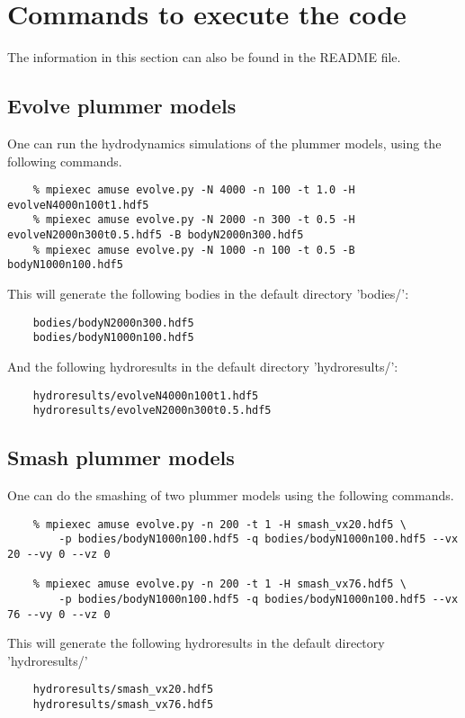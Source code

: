 \documentclass[a4paper]{article}
\begin{document}
\section{Commands to execute the code}
\label{sec:legends}
The information in this section can also be found in the README file.
\subsection{Evolve plummer models}
One can run the hydrodynamics simulations of the plummer models, using the following commands.
    \begin{verbatim}
    % mpiexec amuse evolve.py -N 4000 -n 100 -t 1.0 -H evolveN4000n100t1.hdf5
    % mpiexec amuse evolve.py -N 2000 -n 300 -t 0.5 -H evolveN2000n300t0.5.hdf5 -B bodyN2000n300.hdf5
    % mpiexec amuse evolve.py -N 1000 -n 100 -t 0.5 -B bodyN1000n100.hdf5
    \end{verbatim}
This will generate the following bodies in the  default directory 'bodies/':
    \begin{verbatim}
    bodies/bodyN2000n300.hdf5
    bodies/bodyN1000n100.hdf5
    \end{verbatim}
And the following hydroresults in the default directory 'hydroresults/':
    \begin{verbatim}
    hydroresults/evolveN4000n100t1.hdf5
    hydroresults/evolveN2000n300t0.5.hdf5
    \end{verbatim}
\subsection{Smash plummer models}
One can do the smashing of two plummer models using the following commands.
    \begin{verbatim}
    % mpiexec amuse evolve.py -n 200 -t 1 -H smash_vx20.hdf5 \
        -p bodies/bodyN1000n100.hdf5 -q bodies/bodyN1000n100.hdf5 --vx 20 --vy 0 --vz 0

    % mpiexec amuse evolve.py -n 200 -t 1 -H smash_vx76.hdf5 \
        -p bodies/bodyN1000n100.hdf5 -q bodies/bodyN1000n100.hdf5 --vx 76 --vy 0 --vz 0
    \end{verbatim}
This will generate the following hydroresults in the default directory 'hydroresults/'
    \begin{verbatim}
    hydroresults/smash_vx20.hdf5
    hydroresults/smash_vx76.hdf5
    \end{verbatim}
\end{document}
